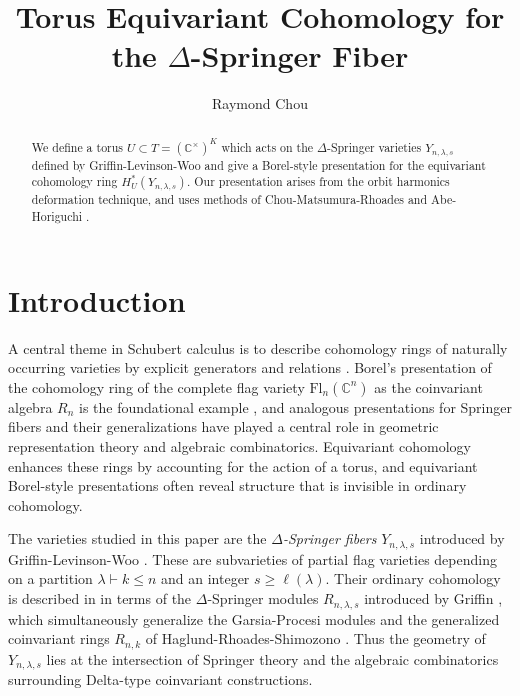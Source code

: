\documentclass[11pt]{amsart}
\numberwithin{equation}{section}
\theoremstyle{definition}
\newcommand{\CC}{{\mathbb{C}}}
\newcommand{\Fl}{\text{Fl}}
\begin{document}
\title[Torus equivariant cohomology for the $\Delta$-Springer Fiber]
{Torus Equivariant Cohomology for the $\Delta$-Springer Fiber}

\author[Raymond Chou]{Raymond Chou}






\begin{abstract}
We define a torus $U \subset T = (\CC^\times)^K$ which acts on the $\Delta$-Springer varieties $Y_{n,\lambda,s}$ defined by Griffin-Levinson-Woo \cite{GLW} and give a Borel-style presentation for the equivariant cohomology ring $H^*_U(Y_{n,\lambda,s})$. Our presentation arises from the orbit harmonics deformation technique, and uses methods of Chou-Matsumura-Rhoades \cite{CMR} and Abe-Horiguchi \cite{AH}.
\end{abstract}



\maketitle

\section{Introduction}\label{sec:introduction}

A central theme in Schubert calculus is to describe cohomology rings of naturally
occurring varieties by explicit generators and relations \cite{AH,AF,CMR,HaradaHoriguchiMasuda2015}. Borel's presentation of
the cohomology ring of the complete flag variety $\Fl_n(\CC^n)$ as the coinvariant algebra $R_n$ is the foundational example \cite{Borel1953}, and analogous presentations for Springer fibers and their
generalizations have played a central role in geometric representation theory and
algebraic combinatorics. Equivariant cohomology enhances these rings by accounting for the action of a torus, and equivariant Borel-style presentations often reveal structure
that is invisible in ordinary cohomology.

The varieties studied in this paper are the \emph{$\Delta$-Springer fibers}
$Y_{n,\lambda,s}$ introduced by Griffin-Levinson-Woo \cite{GLW}. These are
subvarieties of partial flag varieties depending on a partition
$\lambda \vdash k \leq n$ and an integer $s \geq \ell(\lambda)$. Their ordinary
cohomology is described in \cite{GLW} in terms of the $\Delta$-Springer modules
$R_{n,\lambda,s}$ introduced by Griffin \cite{G}, which simultaneously generalize
the Garsia-Procesi modules \cite{GarsiaProcesi1992} and the generalized coinvariant rings $R_{n,k}$ of Haglund-Rhoades-Shimozono \cite{HRS}. Thus the geometry of $Y_{n,\lambda,s}$ lies at the intersection of Springer theory and the algebraic combinatorics surrounding Delta-type coinvariant constructions.
\end{document}
